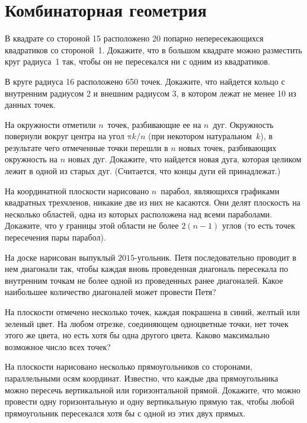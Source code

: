 
\section*{Комбинаторная геометрия}


\begin{problems}

\item
В квадрате со стороной 15 расположено 20 попарно непересекающихся квадратиков
со стороной~1.
Докажите, что в большом квадрате можно разместить круг радиуса~1 так, чтобы
он не пересекался ни с одним из квадратиков.

\item
В круге радиуса 16 расположено 650 точек.
Докажите, что найдется кольцо с внутренним радиусом 2 и внешним радиусом 3,
в котором лежат не менее 10 из данных точек.

\item
На окружности отметили $n$~точек, разбивающие ее на $n$~дуг.
Окружность повернули вокруг центра на угол $\mathrm{\pi} k / n$ (при некотором
натуральном~$k$), в результате чего отмеченные точки перешли в $n$ новых точек,
разбивающих окружность на $n$ новых дуг.
Докажите, что найдется новая дуга, которая целиком лежит в одной из старых дуг.
(Считается, что концы дуги ей принадлежат.)

\item
На координатной плоскости нарисовано $n$~парабол, являющихся графиками
квадратных трехчленов, никакие две из них не касаются.
Они делят плоскость на несколько областей, одна из которых расположена над
всеми параболами.
Докажите, что у границы этой области не более $2 (n - 1)$ углов (то есть точек
пересечения пары парабол).

\item
На доске нарисован выпуклый $2015$-угольник.
Петя последовательно проводит в нем диагонали так, чтобы каждая вновь
проведенная диагональ пересекала по внутренним точкам не более одной
из проведенных ранее диагоналей.
Какое наибольшее количество диагоналей может провести Петя?

\item
На плоскости отмечено несколько точек, каждая покрашена в синий, желтый или
зеленый цвет.
На любом отрезке, соединяющем одноцветные точки, нет точек этого же цвета,
но есть хотя бы одна другого цвета.
Каково максимально возможное число всех точек?

\item
На плоскости нарисовано несколько прямоугольников со сторонами, параллельными
осям координат.
Известно, что каждые два прямоугольника можно пересечь вертикальной или
горизонтальной прямой.
Докажите, что можно провести одну горизонтальную и одну вертикальную прямую
так, чтобы любой прямоугольник пересекался хотя бы с одной из этих двух прямых.

\end{problems}

